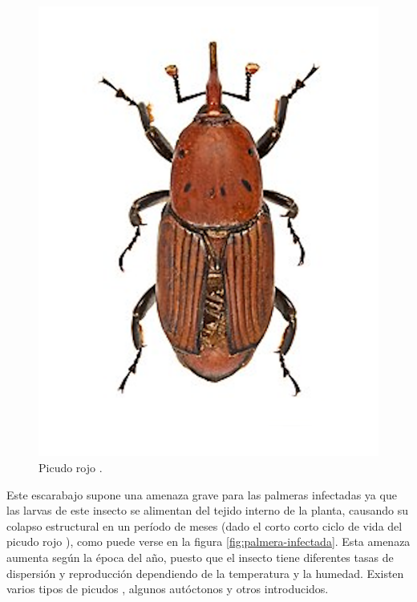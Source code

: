 \begin{figure}[htpb]
  \centering
  \includegraphics[scale=1]{./Figures/picudo-rojo.png}
  \caption{Picudo rojo \protect\footnotemark.}
  \label{fig:picudo-rojo}
\end{figure}


Este escarabajo supone una amenaza grave para las palmeras infectadas ya que las larvas de este insecto se alimentan del tejido interno de la planta, causando su colapso estructural en un período de meses (dado el corto corto ciclo de vida del picudo rojo \citep{anticimex_picudo_nodate}), como puede verse en la figura \ref{fig:palmera-infectada}. Esta amenaza aumenta según la época del año, puesto que el insecto tiene diferentes tasas de dispersión y reproducción dependiendo de la temperatura y la humedad. Existen varios tipos de picudos \citep{poplin_palm_2014}, algunos autóctonos y otros introducidos.

